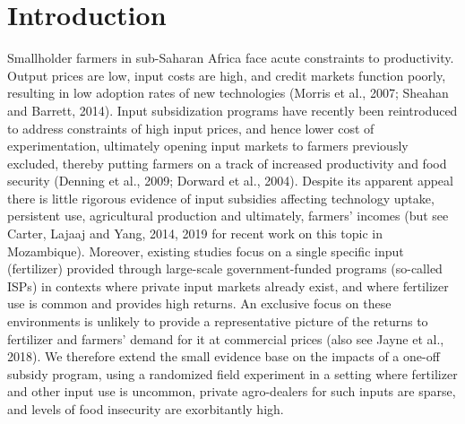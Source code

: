 \section{Introduction} 
Smallholder farmers in sub-Saharan Africa face acute constraints to productivity. Output prices are low, input costs are high, and credit markets function poorly, resulting in low adoption rates of new technologies (Morris et al., 2007; Sheahan and Barrett, 2014). Input subsidization programs have recently been reintroduced to address constraints of high input prices, and hence lower cost of experimentation, ultimately opening input markets to farmers previously excluded, thereby putting farmers on a track of increased productivity and food security (Denning et al., 2009; Dorward et al., 2004). Despite its apparent appeal there is little rigorous evidence of input subsidies affecting technology uptake, persistent use, agricultural production and ultimately, farmers’ incomes (but see Carter, Lajaaj and Yang, 2014, 2019 for recent work on this topic in Mozambique). Moreover, existing studies focus on a single specific input (fertilizer) provided through large-scale government-funded programs (so-called ISPs) in contexts where private input markets already exist, and where fertilizer use is common and provides high returns. An exclusive focus on these environments is unlikely to provide a representative picture of the returns to fertilizer and farmers’ demand for it at commercial prices (also see Jayne et al., 2018). We therefore extend the small evidence base on the impacts of a one-off subsidy program, using a randomized field experiment in a setting where fertilizer and other input use is uncommon, private agro-dealers for such inputs are sparse, and levels of food insecurity are exorbitantly high. 
